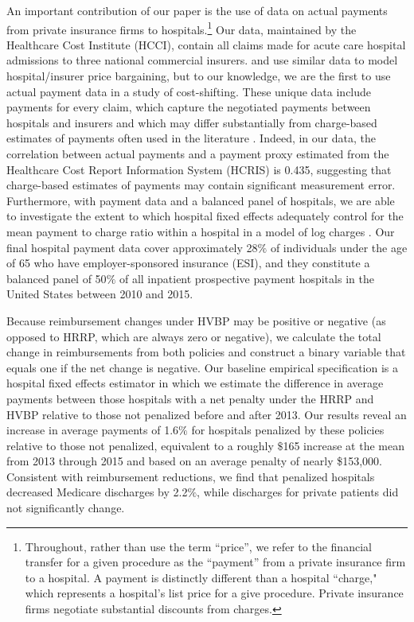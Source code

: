 \documentclass[12pt]{article}
\begin{document}
An important contribution of our paper is the use of data on actual payments from private insurance firms to hospitals.\footnote{Throughout, rather than use the term ``price'', we refer to the financial transfer for a given procedure as the ``payment'' from a private insurance firm to a hospital.  A payment is distinctly different than a hospital ``charge," which represents a hospital's list price for a give procedure.  Private insurance firms negotiate substantial discounts from charges.}  Our data, maintained by the Healthcare Cost Institute (HCCI), contain all claims made for acute care hospital admissions to three national commercial insurers.  \cite{gowrisankaran2015} and \cite{cooper2015} use similar data to model hospital/insurer price bargaining, but to our knowledge, we are the first to use actual payment data in a study of cost-shifting.   These unique data include payments for every claim, which capture the negotiated payments between hospitals and insurers and which may differ substantially from charge-based estimates of payments often used in the literature \citep{dafny2009,dranove2017}. Indeed, in our data, the correlation between actual payments and a payment proxy estimated from the Healthcare Cost Report Information System (HCRIS) is 0.435, suggesting that charge-based estimates of payments may contain significant measurement error.  Furthermore, with payment data and a balanced panel of hospitals, we are able to investigate the extent to which hospital fixed effects adequately control for the mean payment to charge ratio within a hospital in a model of log charges \citep{cutler2000}. Our final hospital payment data cover approximately 28$\%$ of individuals under the age of 65 who have employer-sponsored insurance (ESI), and they constitute a balanced panel of  50$\%$ of all inpatient prospective payment hospitals in the United States between 2010 and 2015.

Because reimbursement changes under HVBP may be positive or negative (as opposed to HRRP, which are always zero or negative), we calculate the total change in reimbursements from both policies and construct a binary variable that equals one if the net change is negative.  Our baseline empirical specification is a hospital fixed effects estimator in which we estimate the difference in average payments between those hospitals with a net penalty under the HRRP and HVBP relative to those not penalized before and after 2013. Our results reveal an increase in average payments of 1.6$\%$ for hospitals penalized by these policies relative to those not penalized, equivalent to a roughly $\$$165 increase at the mean from 2013 through 2015 and based on an average penalty of nearly \$153,000. Consistent with reimbursement reductions, we find that penalized hospitals decreased Medicare discharges by 2.2$\%$, while discharges for private patients did not significantly change.
\end{document}
